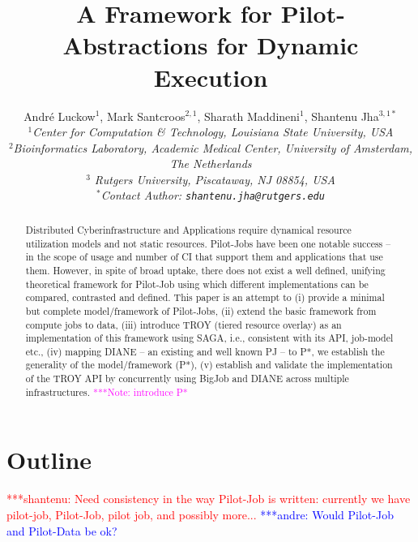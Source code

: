 \documentclass[conference,final]{IEEEtran}
\title{A Framework for Pilot-Abstractions for Dynamic Execution}
\date{}
\newcommand{\jhanote}[1]{ {\textcolor{red} { ***shantenu: #1 }}}
\newcommand{\alnote}[1]{ {\textcolor{blue} { ***andre: #1 }}}
\newcommand{\note}[1]{ {\textcolor{magenta} { ***Note: #1 }}}
\newcommand{\alnote}[1]{}
\newcommand{\jhanote}[1]{}
\newcommand{\note}[1]{}
\newcommand{\up}{\vspace*{-1em}}
\begin{document}
\ifpdf
{}
\else
{}
\fi

\author{
  Andr\'e Luckow$^{1}$, Mark Santcroos$^{2,1}$, Sharath Maddineni$^{1}$, Shantenu Jha$^{3,1*}$\\
  \small{\emph{$^{1}$Center for Computation \& Technology, Louisiana State University, USA}}\\
 \small{\emph{$^{2}$Bioinformatics Laboratory, Academic Medical Center, University of Amsterdam, The Netherlands}}\\
 \small{\emph{$^{3}$ Rutgers University, Piscataway, NJ 08854, USA}}\\
  \small{\emph{$^{*}$Contact Author: \texttt{shantenu.jha@rutgers.edu}}}\\
  \up\up\up\up }

\maketitle

\begin{abstract}
  Distributed Cyberinfrastructure and Applications require dynamical
  resource utilization models and not static resources.  Pilot-Jobs
  have been one notable success -- in the scope of usage and number of
  CI that support them and applications that use them.  However, in
  spite of broad uptake, there does not exist a well defined, unifying
  theoretical framework for Pilot-Job using which different
  implementations can be compared, contrasted and defined. This paper
  is an attempt to (i) provide a minimal but complete model/framework
  of Pilot-Jobs, (ii) extend the basic framework from compute jobs to
  data, (iii) introduce TROY (tiered resource overlay) as an
  implementation of this framework using SAGA, i.e., consistent with
  its API, job-model etc., (iv) mapping DIANE -- an existing and well
  known PJ -- to P*, we establish the generality of the
  model/framework (P*), (v) establish and validate the implementation
  of the TROY API by concurrently using BigJob and DIANE across
  multiple infrastructures.
\note{introduce P*}
\end{abstract}

\section*{Outline}

\jhanote{Need consistency in the way Pilot-Job is written: currently
  we have pilot-job, Pilot-Job, pilot job, and possibly more...} \alnote{Would 
Pilot-Job and Pilot-Data be ok?}
\end{document}
